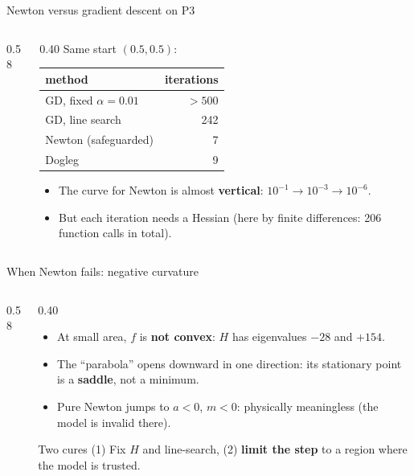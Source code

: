 \begin{frame}{Newton versus gradient descent on P3}
  \begin{columns}[T]
    \begin{column}{0.58\textwidth}
    \end{column}
    \begin{column}{0.40\textwidth}
      \small
      Same start $(0.5,0.5)$:
      \begin{center}
      \begin{tabular}{lr}
        \toprule
        method & iterations\\
        \midrule
        GD, fixed $\alpha=0.01$ & $>500$\\
        GD, line search & 242\\
        Newton (safeguarded) & 7\\
        Dogleg & 9\\
        \bottomrule
      \end{tabular}
      \end{center}
      \begin{itemize}
        \item The curve for Newton is almost \textbf{vertical}: $10^{-1}\to10^{-3}\to10^{-6}$.
        \item But each iteration needs a Hessian (here by finite differences: 206 function calls in total).
      \end{itemize}
    \end{column}
  \end{columns}
\end{frame}

\begin{frame}{When Newton fails: negative curvature}
  \begin{columns}[T]
    \begin{column}{0.58\textwidth}
    \end{column}
    \begin{column}{0.40\textwidth}
      \small
      \begin{itemize}
        \item At small area, $f$ is \textbf{not convex}: $H$ has eigenvalues $-28$ and $+154$.
        \item The ``parabola'' opens downward in one direction: its stationary point is a \textbf{saddle}, not a minimum.
        \item Pure Newton jumps to $a<0$, $m<0$: physically meaningless (the model is invalid there).
      \end{itemize}
      \begin{alertblock}{Two cures}
        (1) Fix $H$ and line-search, (2) \textbf{limit the step} to a region where the model is trusted.
      \end{alertblock}
    \end{column}
  \end{columns}
\end{frame}

